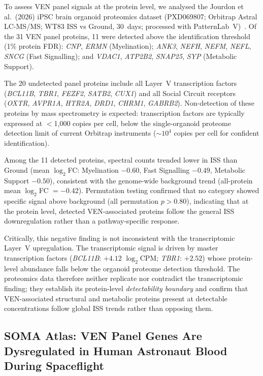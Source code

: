 \documentclass[11pt]{article}
\begin{document}
To assess VEN panel signals at the protein level, we analysed the
Jourdon et al.\ (2026) iPSC brain organoid proteomics dataset
(PXD069807; Orbitrap Astral LC-MS/MS; WT83 ISS vs Ground, 30~days;
processed with PatternLab~V)~\cite{jourdon2026}.
Of the 31 VEN panel proteins, 11 were detected above the identification
threshold (1\% protein FDR): \textit{CNP}, \textit{ERMN} (Myelination);
\textit{ANK3}, \textit{NEFH}, \textit{NEFM}, \textit{NEFL}, \textit{SNCG}
(Fast Signalling); and \textit{VDAC1}, \textit{ATP2B2}, \textit{SNAP25},
\textit{SYP} (Metabolic Support).

The 20 undetected panel proteins include all Layer~V transcription factors
(\textit{BCL11B}, \textit{TBR1}, \textit{FEZF2}, \textit{SATB2},
\textit{CUX1}) and all Social Circuit receptors (\textit{OXTR},
\textit{AVPR1A}, \textit{HTR2A}, \textit{DRD1}, \textit{CHRM1},
\textit{GABRB2}).
Non-detection of these proteins by mass spectrometry is expected:
transcription factors are typically expressed at $<$1,000 copies per cell,
below the single-organoid proteome detection limit of current Orbitrap
instruments ($\sim$$10^4$ copies per cell for confident identification).

Among the 11 detected proteins, spectral counts trended lower in ISS than
Ground (mean $\log_2$FC: Myelination $-0.60$, Fast Signalling $-0.49$,
Metabolic Support $-0.50$), consistent with the genome-wide background
trend (all-protein mean $\log_2$FC $= -0.42$).
Permutation testing confirmed that no category showed specific signal
above background (all permutation $p > 0.80$), indicating that at the
protein level, detected VEN-associated proteins follow the general ISS
downregulation rather than a pathway-specific response.

Critically, this negative finding is not inconsistent with the
transcriptomic Layer~V upregulation.
The transcriptomic signal is driven by master transcription factors
(\textit{BCL11B}: $+4.12$ $\log_2$CPM; \textit{TBR1}: $+2.52$) whose
protein-level abundance falls below the organoid proteome detection
threshold.
The proteomics data therefore neither replicate nor contradict the
transcriptomic finding; they establish its protein-level
\emph{detectability boundary} and confirm that VEN-associated structural
and metabolic proteins present at detectable concentrations follow
global ISS trends rather than opposing them.

\subsection{SOMA Atlas: VEN Panel Genes Are Dysregulated in Human Astronaut
Blood During Spaceflight}
\label{sec:soma}
\end{document}
